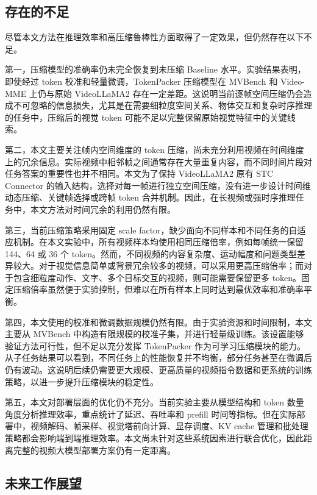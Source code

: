 \subsection{存在的不足}

尽管本文方法在推理效率和高压缩鲁棒性方面取得了一定效果，但仍然存在以下不足。

第一，压缩模型的准确率仍未完全恢复到未压缩 Baseline 水平。实验结果表明，即使经过 token 校准和轻量微调，TokenPacker 压缩模型在 MVBench 和 Video-MME 上仍与原始 VideoLLaMA2 存在一定差距。这说明当前逐帧空间压缩仍会造成不可忽略的信息损失，尤其是在需要细粒度空间关系、物体交互和复杂时序推理的任务中，压缩后的视觉 token 可能不足以完整保留原始视觉特征中的关键线索。

第二，本文主要关注帧内空间维度的 token 压缩，尚未充分利用视频在时间维度上的冗余信息。实际视频中相邻帧之间通常存在大量重复内容，而不同时间片段对任务答案的重要性也并不相同。本文为了保持 VideoLLaMA2 原有 STC Connector 的输入结构，选择对每一帧进行独立空间压缩，没有进一步设计时间维动态压缩、关键帧选择或跨帧 token 合并机制。因此，在长视频或强时序推理任务中，本文方法对时间冗余的利用仍然有限。

第三，当前压缩策略采用固定 scale factor，缺少面向不同样本和不同任务的自适应机制。在本文实验中，所有视频样本均使用相同压缩倍率，例如每帧统一保留 144、64 或 36 个 token。然而，不同视频的内容复杂度、运动幅度和问题类型差异较大。对于视觉信息简单或背景冗余较多的视频，可以采用更高压缩倍率；而对于包含细粒度动作、文字、多个目标交互的视频，则可能需要保留更多 token。固定压缩倍率虽然便于实验控制，但难以在所有样本上同时达到最优效率和准确率平衡。

第四，本文使用的校准和微调数据规模仍然有限。由于实验资源和时间限制，本文主要从 MVBench 中构造有限规模的校准子集，并进行轻量级训练。该设置能够验证方法可行性，但不足以充分发挥 TokenPacker 作为可学习压缩模块的能力。从子任务结果可以看到，不同任务上的性能恢复并不均衡，部分任务甚至在微调后仍有波动。这说明后续仍需要更大规模、更高质量的视频指令数据和更系统的训练策略，以进一步提升压缩模块的稳定性。

第五，本文对部署层面的优化仍不充分。当前实验主要从模型结构和 token 数量角度分析推理效率，重点统计了延迟、吞吐率和 prefill 时间等指标。但在实际部署中，视频解码、帧采样、视觉塔前向计算、显存调度、KV cache 管理和批处理策略都会影响端到端推理效率。本文尚未针对这些系统因素进行联合优化，因此距离完整的视频大模型部署方案仍有一定距离。

\subsection{未来工作展望}

